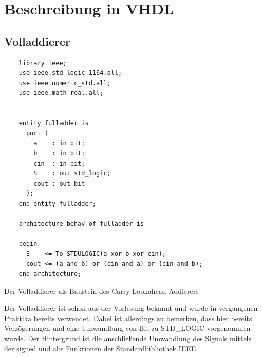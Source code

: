 \documentclass{report}
\newenvironment{longlisting}{\captionsetup{type=listing}}{}
\begin{document}
\section{Beschreibung in VHDL}
\label{sec:beschreibung-vhdl-1}

\subsection{Volladdierer}

\begin{longlisting}
  \centering
  \begin{verbatim}
    library ieee;
    use ieee.std_logic_1164.all;
    use ieee.numeric_std.all;
    use ieee.math_real.all;
    
    
    entity fulladder is
      port (
        a    : in bit;
        b    : in bit;
        cin  : in bit;
        S    : out std_logic;
        cout : out bit
      );
    end entity fulladder;
    
    architecture behav of fulladder is
    
    begin
      S    <= To_STDULOGIC(a xor b xor cin);
      cout <= (a and b) or (cin and a) or (cin and b);
    end architecture;
  \end{verbatim}
  \caption{Der Volladdierer als Baustein des Carry-Lookahead-Addierers}
  \label{code:fulladder}
\end{longlisting}
\vspace*{1em}
\noindent
Der Volladdierer ist schon aus der Vorlesung bekannt und wurde in vergangenen Praktika bereits verwendet. Dabei ist allerdings zu bemerken, dass hier bereits Verzögerungen und eine Umwandlung von Bit zu STD\_LOGIC vorgenommen wurde. Der Hintergrund ist die anschließende Umwandlung des Signals mittels der signed und abs Funktionen der Standardbibliothek IEEE.

\newpage
\end{document}
